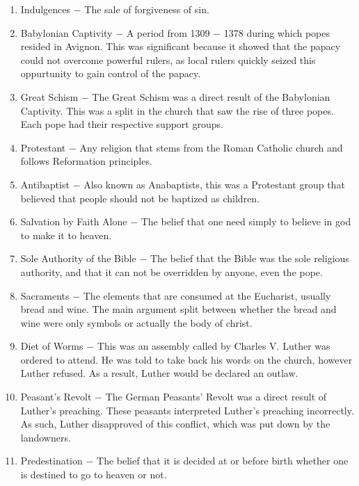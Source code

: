 \documentclass[12pt]{article}
\begin{document}
\begin{enumerate}
\item Indulgences $-$ The sale of forgiveness of sin.

\item Babylonian Captivity $-$ A period from 1309 $-$ 1378 during which popes resided in Avignon. This was significant because it showed that the papacy could not overcome powerful rulers, as local rulers quickly seized this oppurtunity to gain control of the papacy.

\item Great Schism $-$ The Great Schism was a direct result of the Babylonian Captivity. This was a split in the church that saw the rise of three popes. Each pope had their respective support groups.

\item Protestant $-$ Any religion that stems from the Roman Catholic church and follows Reformation principles.

\item Antibaptist $-$ Also known as Anabaptists, this was a Protestant group that believed that people should not be baptized as children.

\item Salvation by Faith Alone $-$ The belief that one need simply to believe in god to make it to heaven.

\item Sole Authority of the Bible $-$ The belief that the Bible was the sole religious authority, and that it can not be overridden by anyone, even the pope.

\item Sacraments $-$ The elements that are consumed at the Eucharist, usually bread and wine. The main argument split between whether the bread and wine were only symbols or actually the body of christ.

\item Diet of Worms $-$ This was an assembly called by Charles V. Luther was ordered to attend. He was told to take back his words on the church, however Luther refused. As a result, Luther would be declared an outlaw.

\item Peasant's Revolt $-$ The German Peasants' Revolt was a direct result of Luther's preaching. These peasants interpreted Luther's preaching incorrectly. As such, Luther disapproved of this conflict, which was put down by the landowners.

\item Predestination $-$ The belief that it is decided at or before birth whether one is destined to go to heaven or not.


\end{enumerate}
\end{document}
